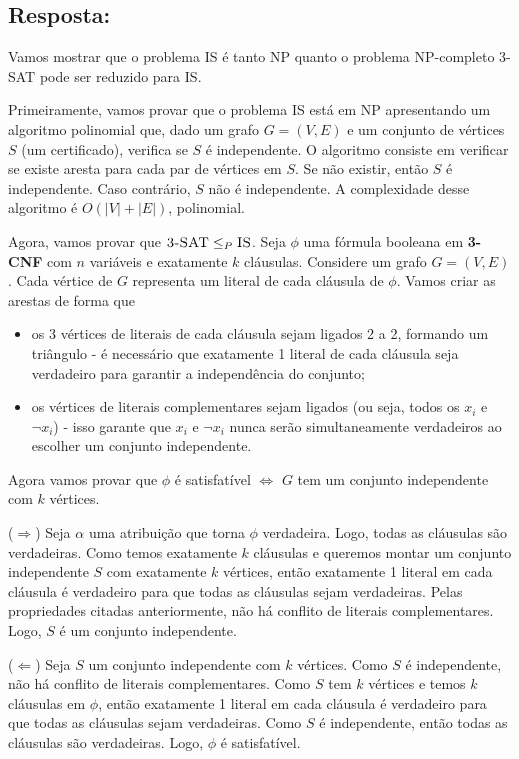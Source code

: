 \documentclass{article}
\begin{document}
\subsection*{Resposta:}
Vamos mostrar que o problema \textsc{IS} é tanto NP quanto o problema NP-completo \textsc{3-SAT} pode ser reduzido para \textsc{IS}.

\bigskip

Primeiramente, vamos provar que o problema \textsc{IS} está em NP apresentando um algoritmo polinomial que, dado um grafo $G=(V,E)$ e um conjunto de vértices $S$ (um certificado), verifica se $S$ é independente.
O algoritmo consiste em verificar se existe aresta para cada par de vértices em $S$.
Se não existir, então $S$ é independente.
Caso contrário, $S$ não é independente.
A complexidade desse algoritmo é $O(|V|+|E|)$, polinomial.

\bigskip

Agora, vamos provar que $\textsc{3-SAT} \leq_P \textsc{IS}$.
Seja $\phi$ uma fórmula booleana em \textbf{3-CNF} com $n$ variáveis e exatamente $k$ cláusulas.
Considere um grafo $G=(V,E)$.
Cada vértice de $G$ representa um literal de cada cláusula de $\phi$.
Vamos criar as arestas de forma que
\begin{itemize}
  \item os 3 vértices de literais de cada cláusula sejam ligados 2 a 2, formando um triângulo - é necessário que exatamente 1 literal de cada cláusula seja verdadeiro para garantir a independência do conjunto;
  \item os vértices de literais complementares sejam ligados (ou seja, todos os $x_i$ e $\neg x_i$) - isso garante que $x_i$ e $\neg x_i$ nunca serão simultaneamente verdadeiros ao escolher um conjunto independente.
\end{itemize}

\medskip

Agora vamos provar que $\phi$ é satisfatível $\iff$ $G$ tem um conjunto independente com $k$ vértices.

($\Rightarrow$) Seja $\alpha$ uma atribuição que torna $\phi$ verdadeira.
Logo, todas as cláusulas são verdadeiras.
Como temos exatamente $k$ cláusulas e queremos montar um conjunto independente $S$ com exatamente $k$ vértices, então exatamente 1 literal em cada cláusula é verdadeiro para que todas as cláusulas sejam verdadeiras.
Pelas propriedades citadas anteriormente, não há conflito de literais complementares.
Logo, $S$ é um conjunto independente.

($\Leftarrow$) Seja $S$ um conjunto independente com $k$ vértices.
Como $S$ é independente, não há conflito de literais complementares.
Como $S$ tem $k$ vértices e temos $k$ cláusulas em $\phi$, então exatamente 1 literal em cada cláusula é verdadeiro para que todas as cláusulas sejam verdadeiras.
Como $S$ é independente, então todas as cláusulas são verdadeiras.
Logo, $\phi$ é satisfatível.
\end{document}
